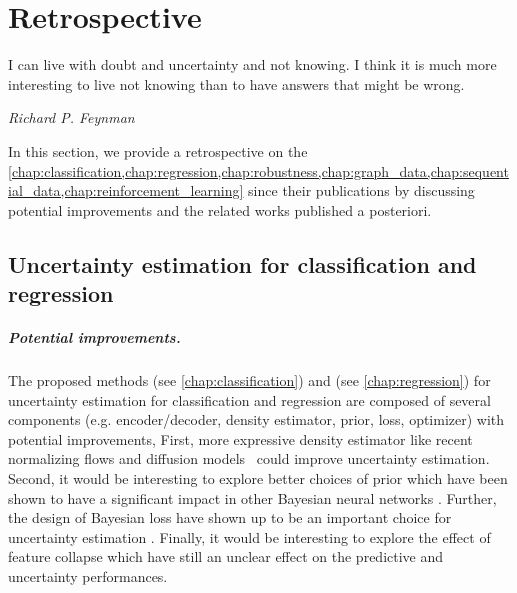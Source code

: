\chapter{Retrospective}
\label{chap:retrospective}

\epigraph{I can live with doubt and uncertainty and not knowing. I think it is much more interesting to live not knowing than to have answers that might be wrong.}{\textit{Richard P. Feynman}}

In this section, we provide a retrospective on the \cref{chap:classification,chap:regression,chap:robustness,chap:graph_data,chap:sequential_data,chap:reinforcement_learning} since their publications by discussing potential improvements and the related works published a posteriori.

\section{Uncertainty estimation for classification and regression} 

\paragraph{Potential improvements.} The proposed methods \PostNetacro{} (see \cref{chap:classification}) and \NatPNacro{} (see \cref{chap:regression}) for uncertainty estimation for classification and regression are composed of several components (e.g. encoder/decoder, density estimator, prior, loss, optimizer) with potential improvements, First, more expressive density estimator like recent normalizing flows \cite{nf-review} and diffusion models \cite{variationaldiffussion2022kingma} could improve uncertainty estimation. Second, it would be interesting to explore better choices of prior which have been shown to have a significant impact in other Bayesian neural networks \cite{bayesposterior2020wenzel, coldaleatoric2020adlam}. Further, the design of Bayesian loss have shown up to be an important choice for uncertainty estimation \cite{bengs2022pitfalls}. Finally, it would be interesting to explore the effect of feature collapse \cite{due} which have still an unclear effect on the predictive and uncertainty performances.

